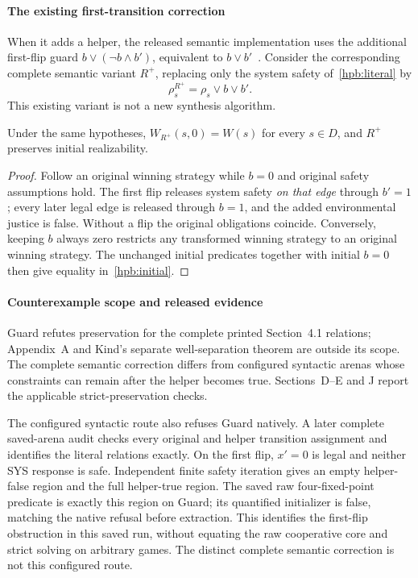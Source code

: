 \paragraph{The existing first-transition correction}
When it adds a helper, the released semantic implementation uses the
additional first-flip guard $b\lor(\neg b\land b')$, equivalent to $b\lor b'$~\cite{spectrarelease2024}.
Consider the corresponding complete semantic variant $R^+$, replacing
only the system safety of~\eqref{hpb:literal} by
\begin{equation}
 \rho_s^{R^+}=\rho_s\lor b\lor b'.
 \label{hpb:corrected}
\end{equation}
This existing variant is not a new synthesis algorithm.
\begin{proposition}
\label{hpb:corrected-preservation}
Under the same hypotheses, $W_{R^+}(s,0)=W(s)$ for every $s\in D$,
and $R^+$ preserves initial realizability.
\end{proposition}
\begin{proof}
Follow an original winning strategy while $b=0$ and original
safety assumptions hold. The first flip releases system safety
\emph{on that edge} through $b'=1$; every later legal edge is released
through $b=1$, and the added environmental justice is false.
Without a flip the original obligations coincide. Conversely, keeping
$b$ always zero restricts any transformed winning strategy to an
original winning strategy. The unchanged initial predicates together
with initial $b=0$ then give equality in~\eqref{hpb:initial}.
\end{proof}

\paragraph{Counterexample scope and released evidence}
Guard refutes preservation for the complete printed Section~4.1
relations; Appendix~A and Kind's separate well-separation theorem are
outside its scope. The complete semantic correction differs from configured syntactic
arenas whose constraints can remain after the helper becomes true.
Sections~D--E and J report the applicable strict-preservation checks.

The configured syntactic route also refuses Guard natively. A later
complete saved-arena audit checks every original and helper transition
assignment and identifies the literal relations exactly. On the first
flip, $x'=0$ is legal and neither SYS response is safe. Independent
finite safety iteration gives an empty helper-false region and the full
helper-true region. The saved raw four-fixed-point predicate is exactly
this region on Guard; its quantified initializer is false, matching the
native refusal before extraction. This identifies the first-flip
obstruction in this saved run, without equating the raw cooperative
core and strict solving on arbitrary games. The distinct complete
semantic correction is not this configured route.

